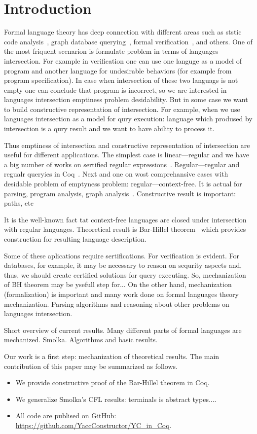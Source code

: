 \section{Introduction}

Formal language theory has deep connection with different areas such as ststic code analysis~\cite{!!!}, graph database querying~\cite{hellingsRelational, hellingsPathQuerying}, formal verification~\cite{!!!}, and others.
One of the most friquent scenarion is formulate problem in terms of languages intersection.
For example in verification one can use one languge as a model of program and another language for undesirable behaviors (for example from program specification).
In case when intersection of these two languags is not empty one can conclude that program is incorrect, so we are interested in languages intersection emptiness problem desidability.
But in some case we want to build constructive representation of intersection. 
For example, when we use languages intersection as a model for qury execution: language which prodused by intersection is a qury result and we want to have ability to process it.

Thus emptiness of intersection and constructive representation of intersection are useful for different applications.
The simplest case is linear---regular and we have a big number of works on sertified regular expressions~\cite{!!!}.
Regular---regular and regualr queryies in Coq~\cite{!!!}.
Next and one on wost comprehansive cases with desidable problem of emptyness problem: regular---context-free.
It is actual for parsing, program analysis, graph analysis~\cite{!!!}.
Constructive result is important: paths, etc

It is the well-known fact tat context-free languages are closed under intersection with regular languages. 
Theoretical result is Bar-Hillel theorem~\cite{bar1961formal} which provides construction for resulting language description.


Some of these aplications require sertifications. 
For verification is evident.
For databases, for example, it may be necessary to reason on sequrity aspects and, thus, we should create certified solutions for query executing.
So, mechanization of BH theorem may be ysefull step for...
On the other hand, mechanization (formalization) is important and many work done on formal languages theory mechanization. 
Parsing algorithms and reasoning about other problems on languages intersection.

Short overview of current results.
Many different parts of formal languages are mechanized. 
Smolka.
Algorithms and basic results.

Our work is a first step: mechanization of theoretical results.
The main contribution of this paper may be summarized as follows.
\begin{itemize}
\item We provide constructive proof of the Bar-Hillel theorem in Coq.
\item We generalize Smolka's CFL results: terminals is abstract types....
\item All code are publised on GitHub: \url{https://github.com/YaccConstructor/YC_in_Coq}.
\end{itemize}
